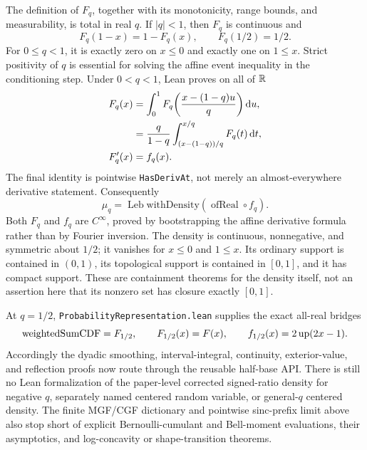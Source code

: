 \documentclass[11pt,oneside]{article}
\theoremstyle{definition}
\theoremstyle{remark}
\begin{document}
The definition of \(F_q\), together with its monotonicity, range bounds, and
measurability, is total in real \(q\).  If \(\lvert q\rvert<1\), then \(F_q\)
is continuous and
\[
  F_q(1-x)=1-F_q(x),\qquad F_q(1/2)=1/2.
\]
For \(0\le q<1\), it is exactly zero on \(x\le0\) and exactly one on
\(1\le x\).  Strict positivity of \(q\) is essential for solving the affine
event inequality in the conditioning step.  Under \(0<q<1\), Lean proves on
all of \(\mathbb{R}\)
\begin{align}
 F_q(x)
 &=\int_0^1 F_q\!\left(\frac{x-(1-q)u}{q}\right)\mathop{}\!\mathrm{d} u,\label{eq:walk-q-cdf-conditioning}\\
 &=\frac{q}{1-q}
   \int_{(x-(1-q))/q}^{x/q}F_q(t)\mathop{}\!\mathrm{d} t,\label{eq:walk-q-cdf-interval}\\
 F_q'(x)&=f_q(x).\label{eq:walk-q-cdf-density}
\end{align}
The final identity is pointwise \nolinkurl{HasDerivAt}, not merely an
almost-everywhere derivative statement.  Consequently
\[
 \mu_q=\operatorname{Leb}\mathbin{\mathrm{withDensity}}
       (\operatorname{ofReal}\circ f_q).
\]
Both \(F_q\) and \(f_q\) are \(C^\infty\), proved by bootstrapping the affine
derivative formula rather than by Fourier inversion.  The density is
continuous, nonnegative, and symmetric about \(1/2\); it vanishes for
\(x\le0\) and \(1\le x\).  Its ordinary support is contained in \((0,1)\),
its topological support is contained in \([0,1]\), and it has compact support.
These are containment theorems for the density itself, not an assertion here
that its nonzero set has closure exactly \([0,1]\).

At \(q=1/2\), \nolinkurl{ProbabilityRepresentation.lean} supplies the exact
all-real bridges
\[
 \operatorname{weightedSumCDF}=F_{1/2},\qquad
 F_{1/2}(x)=F(x),\qquad
 f_{1/2}(x)=2\operatorname{up}(2x-1).
\]
Accordingly the dyadic smoothing, interval-integral, continuity, exterior-value,
and reflection proofs now route through the reusable half-base API.  There is still no
Lean formalization of the paper-level corrected signed-ratio density for negative \(q\), separately named centered
random variable, or general-\(q\) centered density.  The finite
MGF/CGF dictionary and pointwise sinc-prefix limit above also stop short of explicit
Bernoulli-cumulant and Bell-moment evaluations, their asymptotics, and log-concavity or
shape-transition theorems.
\end{document}
